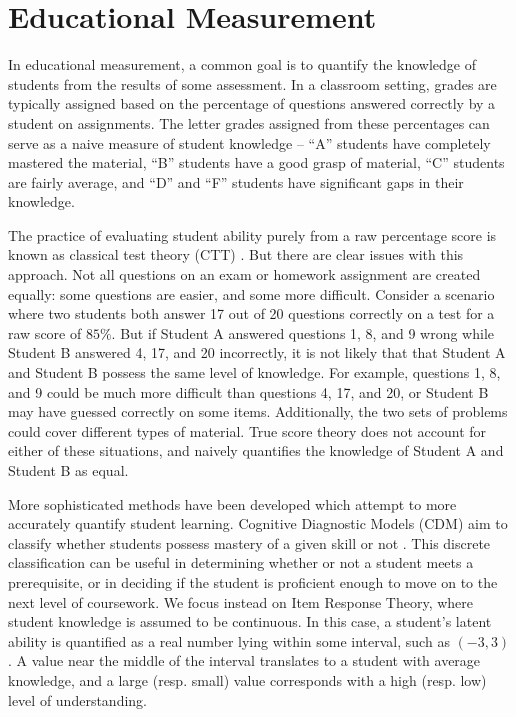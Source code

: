 \section*{Educational Measurement}
In educational measurement, a common goal is to quantify the knowledge of students from the results of some assessment. In a classroom setting, grades are typically assigned based on the percentage of questions answered correctly by a student on assignments. The letter grades assigned from these percentages can serve as a naive measure of student knowledge -- ``A'' students have completely mastered the material, ``B'' students have a good grasp of material, ``C'' students are fairly average, and ``D'' and ``F'' students have significant gaps in their knowledge.

The practice of evaluating student ability purely from a raw percentage score is known as classical test theory (CTT) \cite{thissen}. But there are clear issues with this approach. Not all questions on an exam or homework assignment are created equally: some questions are easier, and some more difficult. Consider a scenario where two students both answer 17 out of 20 questions correctly on a test for a raw score of $85\%$. But if Student A answered questions 1, 8, and 9 wrong while Student B answered 4, 17, and 20 incorrectly, it is not likely that that Student A and Student B possess the same level of knowledge. For example, questions 1, 8, and 9 could be much more difficult than questions 4, 17, and 20, or Student B may have guessed correctly on some items. Additionally, the two sets of problems could cover different types of material. True score theory does not account for either of these situations, and naively quantifies the knowledge of Student A and Student B as equal.

More sophisticated methods have been developed which attempt to more accurately quantify student learning. Cognitive Diagnostic Models (CDM) aim to classify whether students possess mastery of a given skill or not \cite{sinharay2007}. This discrete classification can be useful in determining whether or not a student meets a prerequisite, or in deciding if the student is proficient enough to move on to the next level of coursework. We focus instead on Item Response Theory, where student knowledge is assumed to be continuous. In this case, a student's latent ability is quantified as a real number lying within some interval, such as $(-3,3)$. A value near the middle of the interval translates to a student with average knowledge, and a large (resp. small) value corresponds with a high (resp. low) level of understanding.

